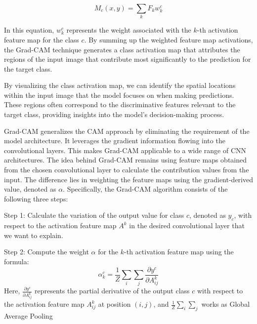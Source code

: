 \begin{equation}
M_c(x, y) = \sum_{k} F_k w_k^c
\end{equation}

In this equation, $w_k^c$ represents the weight associated with the $k$-th activation feature map for the class $c$. By summing up the weighted feature map activations, the Grad-CAM technique generates a class activation map that attributes the regions of the input image that contribute most significantly to the prediction for the target class.

By visualizing the class activation map, we can identify the spatial locations within the input image that the model focuses on when making predictions. These regions often correspond to the discriminative features relevant to the target class, providing insights into the model's decision-making process.

Grad-CAM generalizes the CAM approach by eliminating the requirement of the model architecture. It leverages the gradient information flowing into the convolutional layers. This makes Grad-CAM applicable to a wide range of CNN architectures. The idea behind Grad-CAM remains using feature maps obtained from the chosen convolutional layer to calculate the contribution values from the input. The difference lies in weighting the feature maps using the gradient-derived value, denoted as $\alpha$. Specifically, the Grad-CAM algorithm consists of the following three steps:

Step 1: Calculate the variation of the output value for class $c$, denoted as $y_c$, with respect to the activation feature map $A^k$ in the desired convolutional layer that we want to explain.

Step 2: Compute the weight $\alpha$ for the $k$-th activation feature map using the formula:
\begin{equation}
\alpha_k^c = \frac{1}{Z} \sum_i \sum_j \frac{\partial y^c}{\partial A^k_{ij}}
\end{equation}
%
Here, $\frac{\partial y^c}{\partial A^k_{ij}}$ represents the partial derivative of the output class $c$ with respect to the activation feature map $A^k_{ij}$ at position $(i, j)$, and $\frac{1}{Z}\sum_i \sum_j$ works as Global Average Pooling

